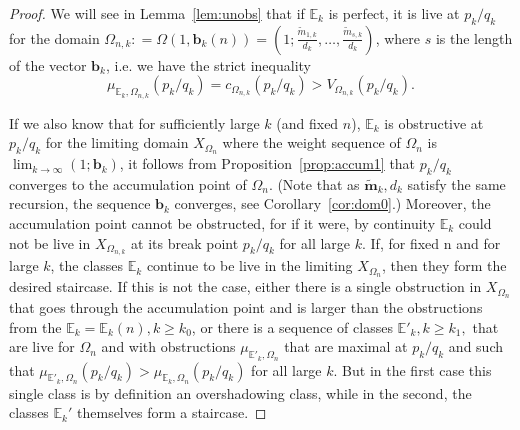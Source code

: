 \documentclass[11pt, reqno]{amsart}
\theoremstyle{remark}
\numberwithin{equation}{subsection}
\numberwithin{figure}{section}
\theoremstyle{customremark}
\newcommand{\Tm}{{\widetilde m}}
\newcommand{\bE}{{\mathbb E}}
\newcommand{\Om}{{\Omega}}
\newcommand{\btm}{\widetilde{\bm{m}}}
\begin{document}
\begin{proof} We will see in Lemma~\ref{lem:unobs} that if $\bE_k$ is perfect, it  is live at $p_k/q_k$ for the domain
$\Om_{n,k}: = \Om(1,\bm{b}_k(n)) = (1;\frac{\widetilde{m}_{1,k}}{d_k},\hdots,\frac{\Tm_{s,k}}{d_k})$, where $s$ is the length of the vector $\bm{b}_k$, i.e. we have the strict inequality
\[ \mu_{\bE_k,\Om_{n,k}}(p_k/q_k)=c_{\Om_{n,k}}(p_k/q_k)>V_{\Om_{n,k}}(p_k/q_k).\]


If we also know that for sufficiently large $k$ (and fixed $n$), $\bE_k$ is obstructive at $p_k/q_k$ for the limiting domain $X_{\Om_n}$ where the weight sequence of $\Om_n$ is $\lim_{k \to \infty} (1;\bm{b}_k)$, it follows from Proposition~\ref{prop:accum1} that  $p_k/q_k$ converges to the accumulation point of $\Om_n$.  (Note that as $\btm_k,d_k$ satisfy the same recursion, 
the %
sequence $\bm{b}_k$
 converges, see Corollary~\ref{cor:dom0}.)  Moreover,  the accumulation point cannot be obstructed, for if it were, by continuity $\bE_k$ could not be live in $X_{\Om_{n,k}}$ at its break point $p_k/q_k$ 
 for all large $k$.
  If, for fixed n and for large $k$, the classes $\bE_k$ continue to be live in the limiting $X_{\Om_n}$, then they form the desired staircase. If this is not the case, either there is a single obstruction in $X_{\Om_n}$ that goes through the accumulation point and is larger than the obstructions from the $\bE_k = \bE_k(n), k\ge k_0$, or there is a sequence of classes 
 $\bE'_k, k\ge k_1,$ that are live for $\Om_n$ and with  obstructions  $\mu_{\bE'_k,\Om_n}$ that are maximal at $p_k/q_k$ and such that $\mu_{\bE'_k,\Om_n}(p_k/q_k) > \mu_{\bE_k,\Om_n}(p_k/q_k)$ for all large $k$.  But in the first case this single class is by definition an overshadowing class, while in the second, the classes $\bE_k'$ themselves form a staircase.
  \end{proof} 
\end{document}

